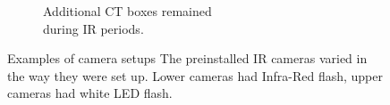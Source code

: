 \begin{figure}
\begin{subfigure}{.5\textwidth}
		  \caption{Additional CT boxes remained\\ during IR periods.}
		  	\label{fig:cam_ex_d}
	\end{subfigure}
		\caption[Examples of camera setups]
		{Examples of camera setups %
		The preinstalled IR cameras varied in the way they were set up. Lower cameras had Infra-Red flash, upper cameras had white LED flash.}
	\label{fig:cam_ex_main}
\end{figure}


